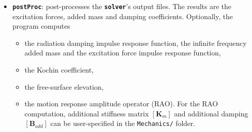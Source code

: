 \documentclass[12pt,a4paper,titlepage]{article}
\newcommand{\bs}{\boldsymbol}
\begin{document}
\begin{itemize}
\item \texttt{\textbf{postProc}}: post-processes the \texttt{\textbf{solver}}'s output files. The results are the excitation forces, added mass and damping coefficients. Optionally, the program computes
\begin{itemize}
\item the radiation damping impulse response function, the infinite frequency added mass and the excitation force impulse response function,
\item the Kochin coefficient,
\item the free-surface elevation,
\item the motion response amplitude operator (RAO). For the RAO computation, additional stiffness matrix $[\bs K_m]$ and additional damping $[\bs B_{add}]$ can be user-specified in the \texttt{Mechanics/} folder.
\end{itemize}
\end{itemize}
\end{document}
